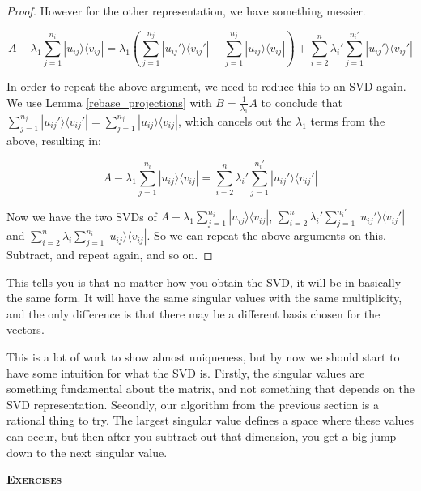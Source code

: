 \documentclass{amsbook}
\begin{document}
\begin{proof}
However for the other representation, we have something messier.

$$
A-\lambda_1\sum_{j=1}^{n_i}|u_{ij}\rangle\langle v_{ij}|=\lambda_1\left(\sum_{j=1}^{n_j}|u_{ij}'\rangle\langle v_{ij}'|-\sum_{j=1}^{n_j}|u_{ij}\rangle\langle v_{ij}|\right)+\sum_{i=2}^n\lambda_i'\sum_{j=1}^{n_i'}|u_{ij}'\rangle\langle v_{ij}'|
$$

In order to repeat the above argument, we need to reduce this to an SVD again.  We use Lemma \ref{rebase_projections} with $B=\frac{1}{\lambda_1}A$ to conclude that $\sum_{j=1}^{n_j}|u_{ij}'\rangle\langle v_{ij}'|=\sum_{j=1}^{n_j}|u_{ij}\rangle\langle v_{ij}|$, which cancels out the $\lambda_1$ terms from the above, resulting in:

$$
A-\lambda_1\sum_{j=1}^{n_i}|u_{ij}\rangle\langle v_{ij}|=\sum_{i=2}^n\lambda_i'\sum_{j=1}^{n_i'}|u_{ij}'\rangle\langle v_{ij}'|
$$

Now we have the two SVDs of $A-\lambda_1\sum_{j=1}^{n_i}|u_{ij}\rangle\langle v_{ij}|$, $\sum_{i=2}^n\lambda_i'\sum_{j=1}^{n_i'}|u_{ij}'\rangle\langle v_{ij}'|$ and $\sum_{i=2}^n\lambda_i\sum_{j=1}^{n_i}|u_{ij}\rangle\langle v_{ij}|$.  So we can repeat the above arguments on this.  Subtract, and repeat again, and so on.

\end{proof}

This tells you is that no matter how you obtain the SVD, it will be in basically the same form.  It will have the same singular values with the same multiplicity, and the only difference is that there may be a different basis chosen for the vectors.

This is a lot of work to show almost uniqueness, but by now we should start to have some intuition for what the SVD is.  Firstly, the singular values are something fundamental about the matrix, and not something that depends on the SVD representation.  Secondly, our algorithm from the previous section is a rational thing to try.  The largest singular value defines a space where these values can occur, but then after you subtract out that dimension, you get a big jump down to the next singular value.

{\bfseries\scshape\Large Exercises}
\end{document}
